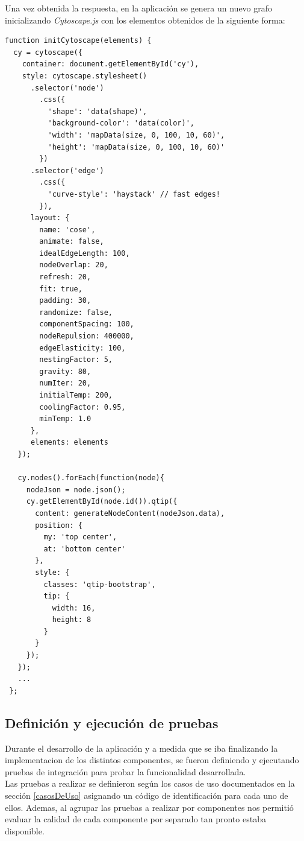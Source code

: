 \documentclass[11pt,a4paper]{article}
\begin{document}
Una vez obtenida la respuesta, en la aplicación se genera un nuevo grafo inicializando \textit{Cytoscape.js} con los elementos obtenidos de la siguiente forma:
\begin{lstlisting}[style=C]
function initCytoscape(elements) {
  cy = cytoscape({
    container: document.getElementById('cy'),
    style: cytoscape.stylesheet()
      .selector('node')
        .css({
          'shape': 'data(shape)',
          'background-color': 'data(color)',
          'width': 'mapData(size, 0, 100, 10, 60)',
          'height': 'mapData(size, 0, 100, 10, 60)'
        })
      .selector('edge')
        .css({
          'curve-style': 'haystack' // fast edges!
        }),
      layout: {
        name: 'cose',
        animate: false,
        idealEdgeLength: 100,
        nodeOverlap: 20,
        refresh: 20,
        fit: true,
        padding: 30,
        randomize: false,
        componentSpacing: 100,
        nodeRepulsion: 400000,
        edgeElasticity: 100,
        nestingFactor: 5,
        gravity: 80,
        numIter: 20,
        initialTemp: 200,
        coolingFactor: 0.95,
        minTemp: 1.0
      },
      elements: elements
   });
   
   cy.nodes().forEach(function(node){
     nodeJson = node.json();
     cy.getElementById(node.id()).qtip({
       content: generateNodeContent(nodeJson.data),
       position: {
         my: 'top center',
         at: 'bottom center'
       },
       style: {
         classes: 'qtip-bootstrap',
         tip: {
           width: 16,
           height: 8
         }
       }
     });
   });
   ...
 };
\end{lstlisting}
\medskip 

\subsection{Definición y ejecución de pruebas}
Durante el desarrollo de la aplicación y a medida que se iba finalizando la implementacion de los distintos componentes, se fueron definiendo y ejecutando pruebas de integración para probar la funcionalidad desarrollada.
\\

Las pruebas a realizar se definieron según los casos de uso documentados en la sección \ref{casosDeUso} asignando un código de identificación para cada uno de ellos. Ademas, al agrupar las pruebas a realizar por componentes nos permitió evaluar la calidad de cada componente por separado tan pronto estaba disponible.
\\
\end{document}
